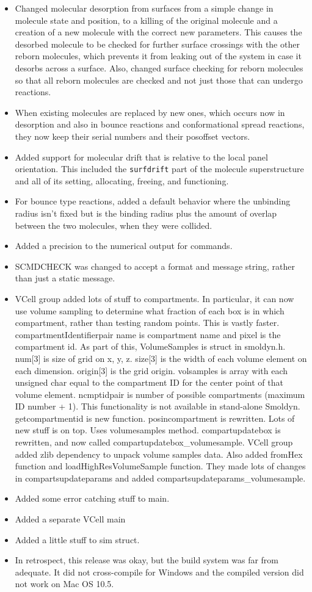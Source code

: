 \documentclass {scrbook}
\newcommand {\ttt} {\texttt}
\begin{document}
\begin{itemize}
\item Changed molecular desorption from surfaces from a simple change in molecule state and position, to a killing of the original molecule and a creation of a new molecule with the correct new parameters. This causes the desorbed molecule to be checked for further surface crossings with the other reborn molecules, which prevents it from leaking out of the system in case it desorbs across a surface. Also, changed surface checking for reborn molecules so that all reborn molecules are checked and not just those that can undergo reactions.
\item When existing molecules are replaced by new ones, which occurs now in desorption and also in bounce reactions and conformational spread reactions, they now keep their serial numbers and their posoffset vectors.
\item Added support for molecular drift that is relative to the local panel orientation. This included the \ttt{surfdrift} part of the molecule superstructure and all of its setting, allocating, freeing, and functioning.
\item For bounce type reactions, added a default behavior where the unbinding radius isn't fixed but is the binding radius plus the amount of overlap between the two molecules, when they were collided.
\item Added a precision to the numerical output for commands.
\item SCMDCHECK was changed to accept a format and message string, rather than just a static message.
\item VCell group added lots of stuff to compartments. In particular, it can now use volume sampling to determine what fraction of each box is in which compartment, rather than testing random points. This is vastly faster. compartmentIdentifierpair name is compartment name and pixel is the compartment id. As part of this, VolumeSamples is struct in smoldyn.h. num[3] is size of grid on x, y, z. size[3] is the width of each volume element on each dimension. origin[3] is the grid origin. volsamples is array with each unsigned char equal to the compartment ID for the center point of that volume element. ncmptidpair is number of possible compartments (maximum ID number + 1). This functionality is not available in stand-alone Smoldyn. getcompartmentid is new function. posincompartment is rewritten. Lots of new stuff is on top. Uses volumesamples method. compartupdatebox is rewritten, and now called compartupdatebox\_volumesample. VCell group added zlib dependency to unpack volume samples data. Also added fromHex function and loadHighResVolumeSample function. They made lots of changes in compartsupdateparams and added compartsupdateparams\_volumesample.
\item Added some error catching stuff to main.
\item Added a separate VCell main
\item Added a little stuff to sim struct.
\item In retrospect, this release was okay, but the build system was far from adequate. It did not cross-compile for Windows and the compiled version did not work on Mac OS 10.5.


\end{itemize}
\end{document}
